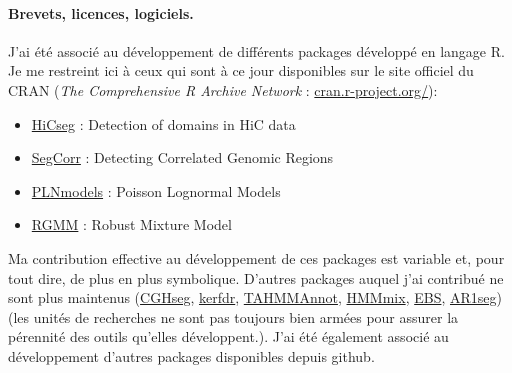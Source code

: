 
\paragraph{Brevets, licences, logiciels.}
J'ai été associé au développement de différents packages développé en langage R. Je me restreint ici à ceux qui sont à ce jour disponibles sur le site officiel du CRAN ({\sl The Comprehensive R Archive Network} : \url{cran.r-project.org/}):
\begin{itemize}
 \item \url{HiCseg} : Detection of domains in HiC data \cite{LDM14}
 \item \url{SegCorr} : Detecting Correlated Genomic Regions \cite{DLM17}
 \item \url{PLNmodels} : Poisson Lognormal Models \cite{CMR18a,CMR19,CMR21}
 \item \url{RGMM} : Robust Mixture Model \cite{GoR24}
\end{itemize}
Ma contribution effective au développement de ces packages est variable et, pour tout dire, de plus en plus symbolique. 
D'autres packages auquel j'ai contribué ne sont plus maintenus (\url{CGHseg}, \url{kerfdr}, \url{TAHMMAnnot}, \url{HMMmix}, \url{EBS}, \url{AR1seg}) (les unités de recherches ne sont pas toujours bien armées pour assurer la pérennité des outils qu'elles développent.). 
J'ai été également associé au développement d'autres packages disponibles depuis github.



